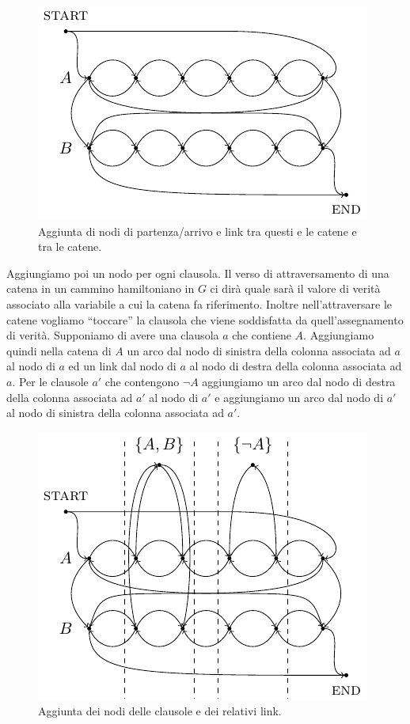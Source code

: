 \begin{figure}[h]
    \begin{center}
        \includegraphics{./img/NPClass/SATdHAM2.pdf}
        \caption{Aggiunta di nodi di partenza/arrivo e link tra questi e le catene e tra le catene.}
    \end{center}
\end{figure}

Aggiungiamo poi un nodo per ogni clausola. Il verso di attraversamento di una catena in un cammino
hamiltoniano in $G$ ci dirà quale sarà il valore di verità associato alla variabile a cui la
catena fa riferimento. Inoltre nell'attraversare le catene vogliamo ``toccare'' la clausola che
viene soddisfatta da quell'assegnamento di verità. Supponiamo di avere una clausola $a$ che
contiene $A$. Aggiungiamo quindi nella catena di $A$ un arco dal nodo di sinistra della colonna
associata ad $a$ al nodo di $a$ ed un link dal nodo di $a$ al nodo di destra della colonna associata
ad $a$. Per le clausole $a'$ che contengono $\lnot A$ aggiungiamo un arco dal nodo di destra della
colonna associata ad $a'$ al nodo di $a'$ e aggiungiamo un arco dal nodo di $a'$ al nodo di sinistra
della colonna associata ad $a'$.

\begin{figure}[h]
    \begin{center}
        \includegraphics{./img/NPClass/SATdHAM3.pdf}
        \caption{Aggiunta dei nodi delle clausole e dei relativi link.}
    \end{center}
\end{figure}

